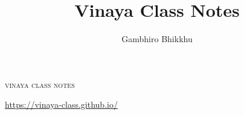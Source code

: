 \documentclass[11pt,oneside]{memoir}
\title{Vinaya Class Notes}
\author{Gambhiro Bhikkhu}
\begin{document}
\frontmatter

{\LARGE\scshape\MakeTextLowercase{Vinaya Class Notes}}

\href{https://vinaya-class.github.io/}{https://vinaya-class.github.io/}

\tableofcontents*



\mainmatter




























\backmatter


\end{document}
